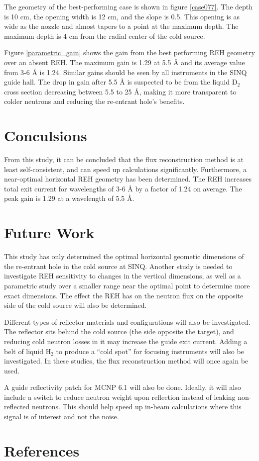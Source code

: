 \documentclass[a4paper]{jpconf}
\begin{document}
The geometry of the best-performing case is shown in figure \ref{case077}.  The depth is 10 cm, the opening width is 12 cm, and the slope is 0.5.  This opening is as wide as the nozzle and almost tapers to a point at the maximum depth.  The maximum depth is 4 cm from the radial center of the cold source.  

Figure \ref{parametric_gain} shows the gain from the best performing REH geometry over an absent REH.  The maximum gain is 1.29 at 5.5 \AA{} and its average value from 3-6 \AA{} is 1.24.  Similar gains should be seen by all instruments in the SINQ guide hall.  The drop in gain after 5.5 \AA{} is suspected to be from the liquid D$_2$ cross section decreasing between 5.5 to 25 \AA{}, making it more transparent to colder neutrons and reducing the re-entrant hole's benefits.


\section{Conculsions}

From this study, it can be concluded that the flux reconstruction method is at least self-consistent, and can speed up calculations significantly.  Furthermore, a near-optimal horizontal REH geometry has been determined.  The REH increases total exit current for wavelengths of 3-6 \AA{} by a factor of 1.24 on average. The peak gain is 1.29 at a wavelength of 5.5 \AA{}.

\section{Future Work}

This study has only determined the optimal horizontal geometic dimensions of the re-entrant hole in the cold source at SINQ.  Another study is needed to investigate REH sensitivity to changes in the vertical dimensions, as well as a parametric study over a smaller range near the optimal point to determine more exact dimensions.  The effect the REH has on the neutron flux on the opposite side of the cold source will also be determined.

Different types of reflector materials and configurations will also be investigated.  The reflector sits behind the cold source (the side opposite the target), and reducing cold neutron losses in it may increase the guide exit current.  Adding a belt of liquid H$_2$ to produce a ``cold spot'' for focusing instruments will also be investigated.  In these studies, the flux reconstruction method will once again be used.

A guide reflectivity patch for MCNP 6.1 will also be done.  Ideally, it will also include a switch to reduce neutron weight upon reflection instead of leaking non-reflected neutrons. This should help speed up in-beam calculations where this signal is of interest and not the noise.

\section*{References}

\end{document}
